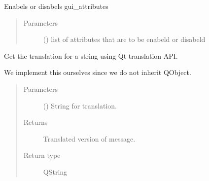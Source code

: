 \documentclass[letterpaper,10pt,english]{sphinxmanual}
\begin{document}
\begin{fulllineitems}
\begin{fulllineitems}
\end{fulllineitems}


\begin{fulllineitems}
\label{\detokenize{code:Tilgjengelighet.Tilgjengelighet.toggle_enable}}
Enabels or disabels gui\_attributes
\begin{quote}\begin{description}
\item[{Parameters}] \leavevmode
{} () \textendash{} list of attributes that are to be enabeld or disabeld

\end{description}\end{quote}

\end{fulllineitems}


\begin{fulllineitems}
\label{\detokenize{code:Tilgjengelighet.Tilgjengelighet.tr}}
Get the translation for a string using Qt translation API.

We implement this ourselves since we do not inherit QObject.
\begin{quote}\begin{description}
\item[{Parameters}] \leavevmode
{} (\sphinxstyleliteralemphasis{\sphinxupquote{, }}) \textendash{} String for translation.

\item[{Returns}] \leavevmode
Translated version of message.

\item[{Return type}] \leavevmode
QString

\end{description}\end{quote}

\end{fulllineitems}


\end{fulllineitems}
\end{document}
